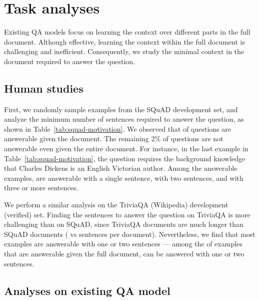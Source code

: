 \documentclass[11pt,a4paper]{article}
\begin{document}
 \section{Task analyses}\label{sec:motivation}Existing QA models focus on learning the context over different parts in the full document.
Although effective, learning the context within the full document is challenging and inefficient.
Consequently, we study the minimal context in the document required to answer the question.

\subsection{Human studies}

First, we randomly sample  examples from the SQuAD development set, and analyze the minimum number of sentences required to answer the question, as shown in Table~\ref{tab:squad-motivation}.
We observed that  of questions are answerable given the document. The remaining 2\% of questions are not answerable even given the entire document.
For instance, in the last example in Table~\ref{tab:squad-motivation}, the question requires the background knowledge that Charles Dickens is an English Victorian author.
Among the answerable examples,  are answerable with a single sentence,  with two sentences, and  with three or more sentences.


We perform a similar analysis on the TriviaQA (Wikipedia) development (verified) set.
Finding the sentences to answer the question on TriviaQA is more challenging than on SQuAD, since TriviaQA documents are much longer than SQuAD documents ( vs  sentences per document).
Nevertheless, we find that most examples are answerable with one or two sentences --- among the  of examples that are answerable given the full document,  can be answered with one or two sentences.

\subsection{Analyses on existing QA model}
\end{document}
